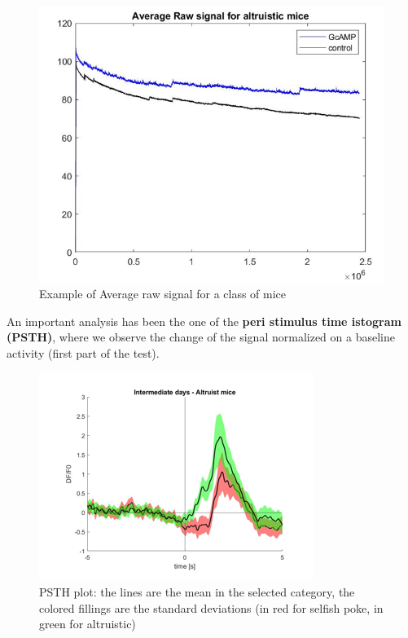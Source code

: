 \documentclass[a4paper]{article}
\begin{document}
		\begin{figure}[H]
			\begin{center}
				\includegraphics[scale=.60]{raw_signal.png} 
			\end{center} 
			\caption{Example of Average raw signal for a class of mice}
		\end{figure}
	
	 An important analysis has been the one of the \textbf{peri stimulus time istogram (PSTH)}, where we observe the change of the signal normalized on a baseline activity (first part of the test).
	 
	 \begin{figure}[H]
	 	
	 	\begin{center}
	 		\includegraphics[scale=.99]{psth.png} 
	 	\end{center} 
	 	\caption{PSTH plot: the lines are the mean in the selected category, the colored fillings are the standard deviations (in red for selfish poke, in green for altruistic)}
	 	
	 \end{figure}
 
\end{document}
